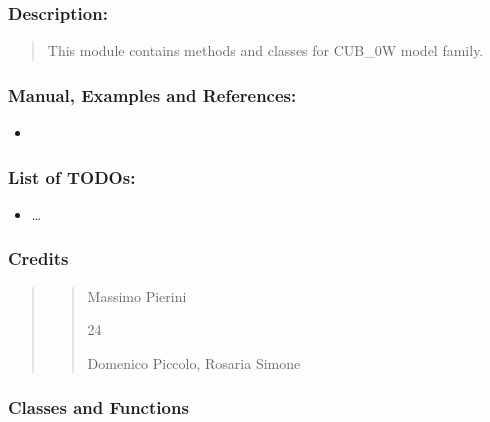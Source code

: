 \documentclass[letterpaper,10pt,english]{sphinxmanual}
\begin{document}
\subsubsection{Description:}
\label{\detokenize{cubmods:id1}}\begin{quote}

\sphinxAtStartPar
This module contains methods and classes
for CUB\_0W model family.
\end{quote}


\subsubsection{Manual, Examples and References:}
\label{\detokenize{cubmods:id2}}\begin{itemize}
\item {} 
\sphinxAtStartPar
{}

\end{itemize}


\subsubsection{List of TODOs:}
\label{\detokenize{cubmods:id3}}\begin{itemize}
\item {} 
\sphinxAtStartPar
…

\end{itemize}


\subsubsection{Credits}
\label{\detokenize{cubmods:id4}}\begin{quote}
\begin{quote}\begin{description}
\sphinxAtStartPar
Massimo Pierini

\sphinxhyphen{}24

\sphinxAtStartPar
Domenico Piccolo, Rosaria Simone

\sphinxAtStartPar
{}

\end{description}\end{quote}
\end{quote}


\subsubsection{Classes and Functions}
\label{\detokenize{cubmods:id5}}
\end{document}
